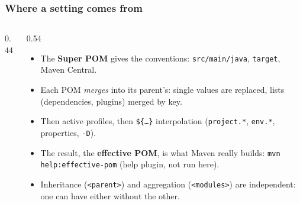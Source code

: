 \documentclass[aspectratio=169,10pt,compress]{beamer}
\begin{document}
\begin{frame}[t,fragile] \frametitle{Where a setting comes from}
  \begin{columns}[T]
    \begin{column}{0.44\textwidth}
      \begin{center}
      \end{center}
    \end{column}
    \begin{column}{0.54\textwidth}
      \begin{itemize}\small
        \item The \textbf{Super POM} gives the conventions: \texttt{src/main/java}, \texttt{target}, Maven Central.
        \item Each POM \emph{merges} into its parent's: single values are replaced, lists (dependencies, plugins) merged by key.
        \item Then active profiles, then \texttt{\$\{\dots\}} interpolation (\texttt{project.*}, \texttt{env.*}, properties, \texttt{-D}).
        \item The result, the \textbf{effective POM}, is what Maven really builds: \texttt{mvn help:effective-pom} (help plugin, not run here).
        \item Inheritance (\texttt{<parent>}) and aggregation (\texttt{<modules>}) are independent: one can have either without the other.
      \end{itemize}
    \end{column}
  \end{columns}
\end{frame}

\end{document}
